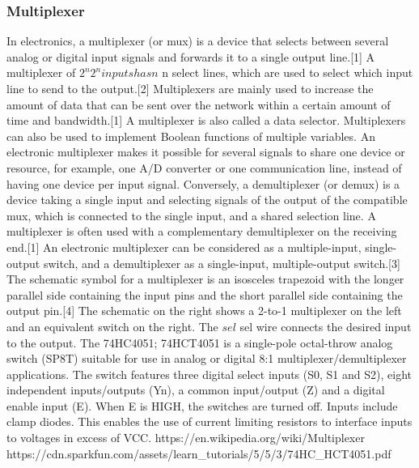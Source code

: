 \subsubsection{Multiplexer}
In electronics, a multiplexer (or mux) is a device that selects between several analog 
or digital input signals and forwards it to a single output line.[1] A multiplexer of 
${\displaystyle 2^{n}} 2^{n} inputs has {\displaystyle n}$ n select lines, which are 
used to select which input line to send to the output.[2] Multiplexers are mainly used 
to increase the amount of data that can be sent over the network within a certain amount 
of time and bandwidth.[1] A multiplexer is also called a data selector. Multiplexers can 
also be used to implement Boolean functions of multiple variables.
An electronic multiplexer makes it possible for several signals to share one device or 
resource, for example, one A/D converter or one communication line, instead of having one 
device per input signal.
Conversely, a demultiplexer (or demux) is a device taking a single input and selecting 
signals of the output of the compatible mux, which is connected to the single input, and 
a shared selection line. A multiplexer is often used with a complementary demultiplexer 
on the receiving end.[1]
An electronic multiplexer can be considered as a multiple-input, single-output switch, 
and a demultiplexer as a single-input, multiple-output switch.[3] The schematic symbol 
for a multiplexer is an isosceles trapezoid with the longer parallel side containing the 
input pins and the short parallel side containing the output pin.[4] The schematic on the 
right shows a 2-to-1 multiplexer on the left and an equivalent switch on the right. 
The ${\displaystyle sel}$ sel wire connects the desired input to the output.
The 74HC4051; 74HCT4051 is a single-pole octal-throw analog switch (SP8T) suitable for 
use in analog or digital 8:1 multiplexer/demultiplexer applications. The switch features 
three digital select inputs (S0, S1 and S2), eight independent inputs/outputs (Yn), a 
common input/output (Z) and a digital enable input (E). When E is HIGH, the switches are 
turned off. Inputs include clamp diodes. This enables the use of current limiting resistors 
to interface inputs to voltages in excess of VCC.
https://en.wikipedia.org/wiki/Multiplexer
https://cdn.sparkfun.com/assets/learn_tutorials/5/5/3/74HC_HCT4051.pdf

